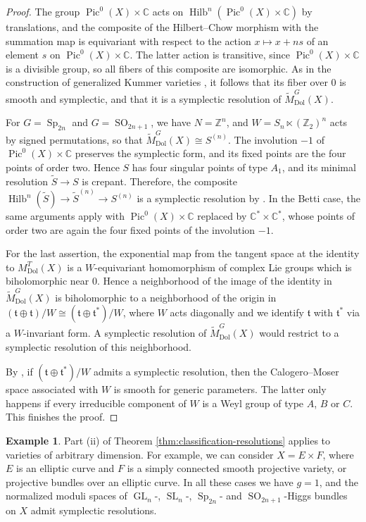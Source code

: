 \documentclass[11pt, a4paper]{amsart}
\theoremstyle{definition}
\newtheorem{example}[theorem]{Example}
\theoremstyle{myitemstyle}
\newcommand{\Z}{\mathbb{Z}}
\newcommand{\C}{\mathbb{C}}
\DeclareMathOperator{\Hilb}{\mathrm{Hilb}}
\DeclareMathOperator{\Pic}{Pic}
\DeclareMathOperator{\GL}{GL}
\DeclareMathOperator{\Sp}{Sp}
\DeclareMathOperator{\SO}{SO}
\DeclareMathOperator{\SL}{SL}
\newcommand{\Dol}{{\mathrm{Dol}}}
\begin{document}
\begin{proof}
    The group $\Pic^0(X)\times\C$ acts on $\Hilb^n(\Pic^0(X)\times\C)$ by translations, and the composite of the Hilbert--Chow morphism with the summation map is equivariant with respect to the action $x\mapsto x+ns$ of an element $s$ on $\Pic^0(X)\times\C$. The latter action is transitive, since $\Pic^0(X)\times\C$ is a divisible group, so all fibers of this composite are isomorphic. As in the construction of generalized Kummer varieties \cite[\S7]{B83}, it follows that its fiber over $0$ is smooth and symplectic, and that it is a symplectic resolution of $\widetilde M^G_\Dol(X)$. 
    
    For $G=\Sp_{2n}$ and $G=\SO_{2n+1}$, we have $N=\Z^n$, and $W=S_n\ltimes (\Z_2)^n$ acts by signed permutations, so that $\widetilde M^G_\Dol(X)\cong S^{(n)}$. The involution $-1$ of $\Pic^0(X)\times\C$ preserves the symplectic form, and its fixed points are the four points of order two. Hence $S$ has four singular points of type $A_1$, and its minimal resolution $\widetilde S\to S$ is crepant. Therefore, the composite $\Hilb^n(\widetilde S)\to\widetilde S^{(n)}\to S^{(n)}$ is a symplectic resolution by \cite{F68,B83}. In the Betti case, the same arguments apply with $\Pic^0(X)\times\C$ replaced by $\C^*\times\C^*$, whose points of order two are again the four fixed points of the involution $-1$.
	
	For the last assertion, the exponential map from the tangent space at the identity to $M^T_\Dol(X)$ is a $W$-equivariant homomorphism of complex Lie groups which is biholomorphic near $0$. Hence a neighborhood of the image of the identity in $\widetilde M^G_\Dol(X)$ is biholomorphic to a neighborhood of the origin in $(\mathfrak t\oplus\mathfrak t)/W\cong(\mathfrak t\oplus\mathfrak t^*)/W$, where $W$ acts diagonally and we identify $\mathfrak t$ with $\mathfrak t^*$ via a $W$-invariant form. A symplectic resolution of $\widetilde M^G_\Dol(X)$ would restrict to a symplectic resolution of this neighborhood.
	
	By \cite{GK04,B09}, if $(\mathfrak t\oplus\mathfrak t^*)/W$ admits a symplectic resolution, then the Calogero--Moser space associated with $W$ is smooth for generic parameters. The latter  only happens if every irreducible component of $W$ is a Weyl group of type $A$, $B$ or $C$. This finishes the proof.
\end{proof}

\begin{example}
	Part (ii) of Theorem \ref{thm:classification-resolutions} applies to varieties of arbitrary dimension. For example, we can consider  $X=E\times F$, where $E$ is an elliptic curve and $F$ is a simply connected smooth projective variety, or  projective bundles over an elliptic curve. In all these cases we have $g=1$, and the normalized moduli spaces of $\GL_n$-, $\SL_n$-, $\Sp_{2n}$- and $\SO_{2n+1}$-Higgs bundles on $X$ admit symplectic resolutions.
\end{example}

%

{}
\end{document}
